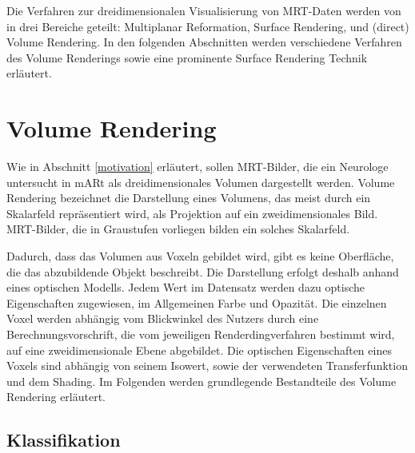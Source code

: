 Die Verfahren zur dreidimensionalen Visualisierung von MRT-Daten werden von \cite{Zhang10} in drei Bereiche geteilt: Multiplanar Reformation, Surface Rendering, und (direct) Volume Rendering. In den folgenden Abschnitten werden verschiedene Verfahren des Volume Renderings sowie eine prominente Surface Rendering Technik erläutert.

\section{Volume Rendering}							  %

Wie in Abschnitt \ref{motivation} erläutert, sollen MRT-Bilder, die ein Neurologe untersucht in mARt als dreidimensionales Volumen dargestellt werden. Volume Rendering bezeichnet die Darstellung eines Volumens, das meist durch ein Skalarfeld repräsentiert wird, als Projektion auf ein zweidimensionales Bild. MRT-Bilder, die in Graustufen vorliegen bilden ein solches Skalarfeld. 

Dadurch, dass das Volumen aus Voxeln gebildet wird, gibt es keine Oberfläche, die das abzubildende Objekt beschreibt. Die Darstellung erfolgt deshalb anhand eines optischen Modells. Jedem Wert im Datensatz werden dazu optische Eigenschaften zugewiesen, im Allgemeinen Farbe und Opazität. %
Die einzelnen Voxel werden abhängig vom Blickwinkel des Nutzers durch eine Berechnungsvorschrift, die vom jeweiligen Renderdingverfahren bestimmt wird, auf eine zweidimensionale Ebene abgebildet.
Die optischen Eigenschaften eines Voxels sind abhängig von seinem Isowert, sowie der verwendeten Transferfunktion und dem Shading. 
Im Folgenden werden grundlegende Bestandteile des Volume Rendering erläutert.%

\subsection{Klassifikation}
\label{klassifikation}


